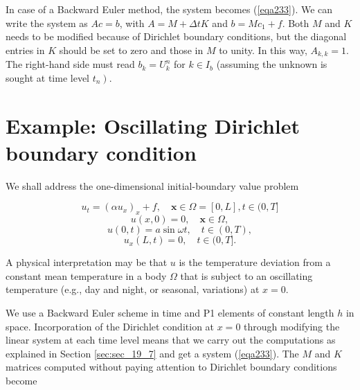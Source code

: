 \documentclass[../main.tex]{subfiles}
\begin{document}
		In case of a Backward Euler method, the system becomes (\ref{eqa233}). We can write the system as $A c=b$, with $A=M+\Delta t K$ and $b=M c_{1}+f$. Both $M$ and $K$ needs to be modified because of Dirichlet boundary conditions, but the diagonal entries in $K$ should be set to zero and those in $M$ to unity. In this way, $A_{k, k}=1$. The right-hand side must read $b_{k}=U_{k}^{n}$ for $k \in I_{b}$ (assuming the unknown is sought at time level $\left.t_{n}\right)$.
	\section[Example: Oscillating Dirichlet boundary condition]{Example: Oscillating Dirichlet boundary condition}
		\label{sec:sec_19_9}
		 \noindent We shall address the one-dimensional initial-boundary value problem
		 
		\begin{equation}
		\label{240}
			u_{t}=\left(\alpha u_{x}\right)_{x}+f, \quad \boldsymbol{x} \in \Omega=[0, L], t \in(0, T]
		\end{equation}
		\begin{equation}
	 	\label{241}
			u(x, 0)=0, \quad \boldsymbol{x} \in \Omega,
		\end{equation}
		\begin{equation}
		\label{eqa242}
			u(0, t)=a \sin \omega t, \quad t \in(0, T),
		\end{equation}
		\begin{equation}
		\label{eqa243}
			u_{x}(L, t)=0, \quad t \in(0, T] .
		\end{equation}
	
		 \noindent A physical interpretation may be that $u$ is the temperature deviation from a constant mean temperature in a body $\Omega$ that is subject to an oscillating temperature (e.g., day and night, or seasonal, variations) at $x=0$.
		 
		 We use a Backward Euler scheme in time and P1 elements of constant length $h$ in space. Incorporation of the Dirichlet condition at $x=0$ through modifying the linear system at each time level means that we carry out the computations as explained in Section \ref{sec:sec_19_7} and get a system (\ref{eqa233}). The $M$ and $K$ matrices computed without paying attention to Dirichlet boundary conditions become
		 
\end{document}
